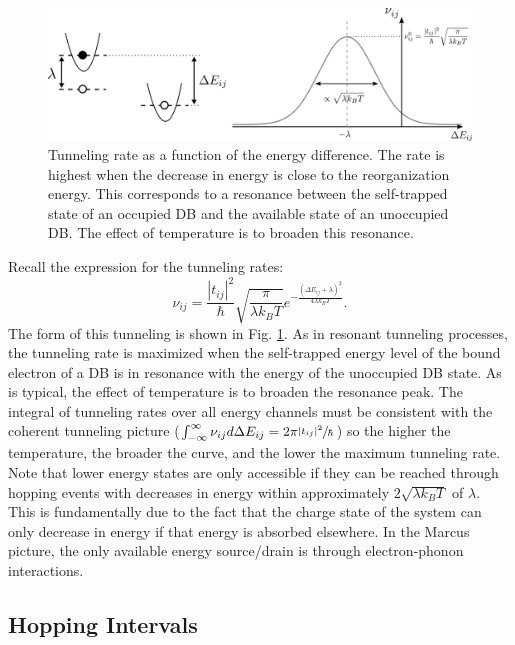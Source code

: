 \documentclass[11pt]{article}
\newcommand{\kt}{k_B T}
\begin{document}
\begin{figure}[h!]
\centering
 \includegraphics[width=.8\textwidth]{nu-v-dE}
 \caption{Tunneling rate as a function of the energy difference. The rate is highest when the decrease in energy is close to the reorganization energy. This corresponds to a resonance between the self-trapped state of an occupied DB and the available state of an unoccupied DB. The effect of temperature is to broaden this resonance.}
 \label{fig:nu-v-dE}
\end{figure}
Recall the expression for the tunneling rates:
\[
\nu_{ij} = \frac{|t_{ij}|^2}{\hbar} \sqrt{\frac{\pi}{\lambda \kt}} e^{-\frac{(\Delta E_{ij} + \lambda)^2}{4\lambda \kt}}.
\]
The form of this tunneling is shown in Fig. \ref{fig:nu-v-dE}. As in resonant tunneling processes, the tunneling rate is maximized when the self-trapped energy level of the bound electron of a DB is in resonance with the energy of the unoccupied DB state. As is typical, the effect of temperature is to broaden the resonance peak. The integral of tunneling rates over all energy channels must be consistent with the coherent tunneling picture ($\int_{-\infty}^\infty \nu_{ij} d\Delta E_{ij} = 2\pi \sfrac{|t_{ij}|^2}{\hbar}$) so the higher the temperature, the broader the curve, and the lower the maximum tunneling rate. Note that lower energy states are only accessible if they can be reached through hopping events with decreases in energy within approximately $2\sqrt{\lambda \kt}$ of $\lambda$. This is fundamentally due to the fact that the charge state of the system can only decrease in energy if that energy is absorbed elsewhere. In the Marcus picture, the only available energy source/drain is through electron-phonon interactions. 


\subsection{Hopping Intervals}
\end{document}
